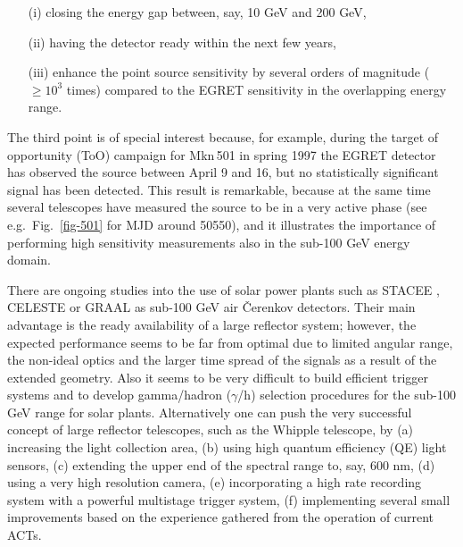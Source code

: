 \begin{itemize}
\item[(i)]   closing the energy gap between, say, 10 GeV and 200 GeV,

\item[(ii)]   having the detector ready within the next few years,

\item[(iii)]   enhance the point source sensitivity by several orders of
magnitude ($\geq 10^3$ times) compared to the EGRET sensitivity
in the overlapping
energy range.
\end{itemize}

The third point is of special interest because, for example,
during the target of opportunity (ToO) campaign for Mkn\,501 in spring
1997 the EGRET detector has observed the source between April 9 and 16,
but no statistically significant signal has been detected.
This result is remarkable, because at the same time several
\Cerenkov telescopes have measured the source to be in a very active
phase (see e.g.\ Fig.~\ref{fig-501} for MJD around 50550), and it
illustrates the importance of performing
high sensitivity measurements also in the sub-100 GeV energy domain.

There are ongoing studies into the use of solar power plants such as STACEE
\cite{ragan:97}, CELESTE
\cite{celeste:95} or GRAAL \cite{graal:97} as sub-100 GeV air
\v{C}erenkov detectors.  Their main advantage is the ready availability of a
large reflector system; however, the  expected performance 
seems to be far from optimal
due to limited angular range, the non-ideal optics and the larger time
spread of the signals as a result of the extended geometry. Also it 
seems to be very
difficult to build efficient trigger systems 
and to develop gamma/hadron ($\gamma$/h) selection 
procedures for the  sub-100 GeV range for solar
plants.
Alternatively
one can push the very successful concept of large reflector telescopes, such
as the Whipple telescope, by (a) increasing the light collection area,  (b)
using high quantum efficiency (QE) light sensors, 
(c) extending the upper end of
the spectral range to,  say, 600 nm, (d) using a very 
high resolution camera, (e)
incorporating a high rate recording  system with a powerful multistage
trigger system, (f) implementing several small improvements  based on
the experience gathered from the operation of 
current ACTs.

